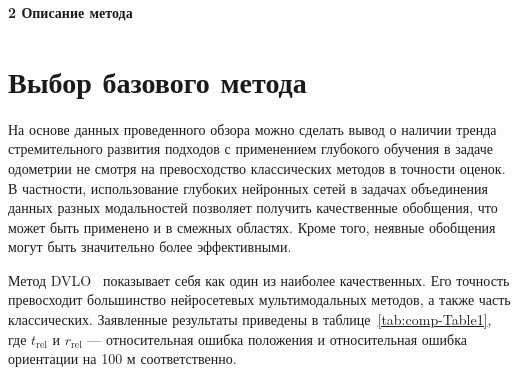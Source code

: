 \newpage
\begin{center}
  \textbf{\large 2 Описание метода}
\end{center}

\section{Выбор базового метода}
На основе данных проведенного обзора можно сделать вывод о наличии тренда стремительного развития
подходов с применением глубокого обучения в задаче одометрии не смотря на превосходство
классических методов в точности оценок. В частности, использование
глубоких нейронных сетей в задачах объединения данных разных модальностей позволяет
получить качественные обобщения, что может быть применено и в смежных областях. Кроме
того, неявные обобщения могут быть значительно более эффективными.

Метод DVLO~\cite{liu2024dvlo} показывает себя как один из наиболее качественных. Его точность
превосходит большинство нейросетевых мультимодальных методов, а также часть классических. Заявленные
результаты приведены в таблице~\ref{tab:comp-Table1}, где $t_{\mathrm{rel}}$ и $r_{\mathrm{rel}}$ --- относительная ошибка положения и относительная ошибка ориентации на 100 м соответственно.

